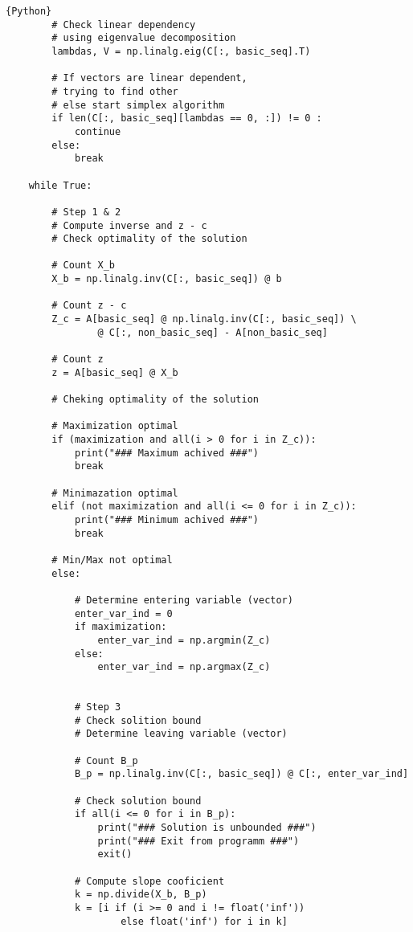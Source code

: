 \documentclass[12pt, legalpaper]{exam}
\begin{document}
\begin{lstlisting}{Python}
        # Check linear dependency 
        # using eigenvalue decomposition 
        lambdas, V = np.linalg.eig(C[:, basic_seq].T)
        
        # If vectors are linear dependent,
        # trying to find other
        # else start simplex algorithm 
        if len(C[:, basic_seq][lambdas == 0, :]) != 0 :
            continue
        else:
            break 
    
    while True:
        
        # Step 1 & 2
        # Compute inverse and z - c
        # Check optimality of the solution
    
        # Count X_b
        X_b = np.linalg.inv(C[:, basic_seq]) @ b
    
        # Count z - c        
        Z_c = A[basic_seq] @ np.linalg.inv(C[:, basic_seq]) \
                @ C[:, non_basic_seq] - A[non_basic_seq]
    
        # Count z
        z = A[basic_seq] @ X_b
    
        # Cheking optimality of the solution
    
        # Maximization optimal
        if (maximization and all(i > 0 for i in Z_c)):
            print("### Maximum achived ###")
            break
    
        # Minimazation optimal
        elif (not maximization and all(i <= 0 for i in Z_c)):
            print("### Minimum achived ###")
            break
            
        # Min/Max not optimal
        else:
    
            # Determine entering variable (vector)
            enter_var_ind = 0
            if maximization:
                enter_var_ind = np.argmin(Z_c)
            else: 
                enter_var_ind = np.argmax(Z_c)
    
    
            # Step 3
            # Check solition bound
            # Determine leaving variable (vector)
    
            # Count B_p
            B_p = np.linalg.inv(C[:, basic_seq]) @ C[:, enter_var_ind]
    
            # Check solution bound
            if all(i <= 0 for i in B_p):
                print("### Solution is unbounded ###")
                print("### Exit from programm ###")
                exit()
    
            # Compute slope cooficient
            k = np.divide(X_b, B_p)
            k = [i if (i >= 0 and i != float('inf')) 
                    else float('inf') for i in k]
    

\end{lstlisting}
\end{document}
